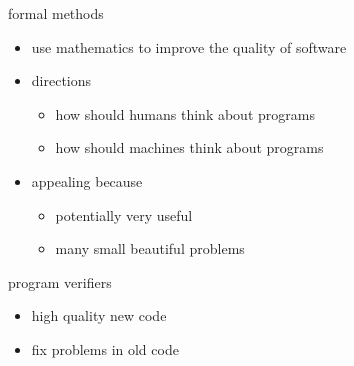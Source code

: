 \documentclass{beamer}
\title{\titletext}
\author{Radu Grigore}
\date{23 August 2010}
\begin{document}
\maketitle
\begin{frame}
  \begin{block}{formal methods}
  \begin{itemize}
  \item use mathematics to improve the quality of software
  \item directions
    \begin{itemize}
    \item how should humans think about programs
    \item how should machines think about programs
    \end{itemize}
  \item appealing because
    \begin{itemize}
    \item potentially very useful
    \item many small beautiful problems
    \end{itemize}
  \end{itemize}
  \end{block}

  \begin{block}{program verifiers}
  \begin{itemize}
  \item high quality new code
  \item fix problems in old code
  \end{itemize}
  \end{block}
\end{frame}
\end{document}
